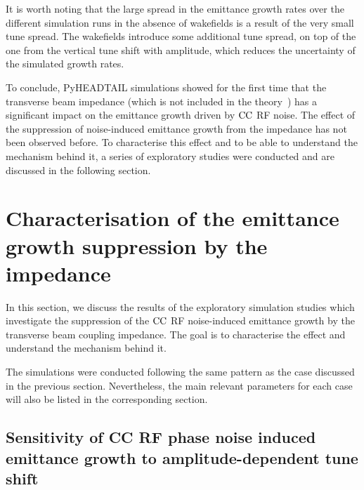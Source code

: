 It is worth noting that the large spread in the emittance growth rates over the different simulation runs in the absence of wakefields is a result of the very small tune spread. The wakefields introduce some additional tune spread, on top of the one from the vertical tune shift with amplitude, which reduces the uncertainty of the simulated growth rates.

To conclude, PyHEADTAIL simulations showed for the first time that the transverse beam impedance (which is not included in the theory~\cite{PhysRevSTAB.18.101001}) has a significant impact on the emittance growth driven by ${\mathrm{CC}}$ RF noise. The effect of the suppression of noise-induced emittance growth from the impedance has not been observed before. 
To characterise this effect and to be able to understand the mechanism behind it, a series of exploratory studies were conducted and are discussed in the following section. 


\section{Characterisation of the emittance growth suppression by the impedance}\label{sec:emittance_growth_exploratory_studies}

In this section, we discuss the results of the exploratory simulation studies which investigate the suppression of the ${\mathrm{CC}}$ RF noise-induced emittance growth by the transverse beam coupling impedance. The goal is to characterise the effect and understand the mechanism behind it. 

The simulations were conducted following the same pattern as the case discussed in the previous section. Nevertheless, the main relevant parameters for each case will also be listed in the corresponding section.

\subsection{Sensitivity of CC RF phase noise induced emittance growth to amplitude-dependent tune shift}\label{subsec:amplitude_detuning_scan}

